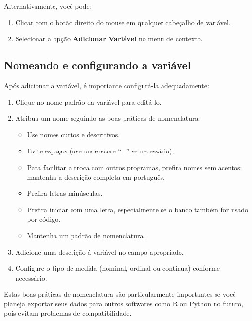 Alternativamente, você pode:
\begin{enumerate}
    \item Clicar com o botão direito do mouse em qualquer cabeçalho de variável.
    \item Selecionar a opção \textbf{Adicionar Variável} no menu de contexto.
\end{enumerate}


\subsection{Nomeando e configurando a variável}

Após adicionar a variável, é importante configurá-la adequadamente:

\begin{enumerate}
    \item Clique no nome padrão da variável para editá-lo.
    \item Atribua um nome seguindo as boas práticas de nomenclatura:
    \begin{itemize}
        \item Use nomes curtos e descritivos.
        \item Evite espaços (use underscore ``\_'' se necessário);
        \item Para facilitar a troca com outros programas, prefira nomes sem acentos; mantenha a descrição completa em português.
        \item Prefira letras minúsculas.
        \item Prefira iniciar com uma letra, especialmente se o banco também for usado por código.
        \item Mantenha um padrão de nomenclatura.
    \end{itemize}
    \item Adicione uma descrição à variável no campo apropriado.
    \item Configure o tipo de medida (nominal, ordinal ou contínua) conforme necessário.
\end{enumerate}

Estas boas práticas de nomenclatura são particularmente importantes se você planeja exportar seus dados para outros softwares como R ou Python no futuro, pois evitam problemas de compatibilidade.

